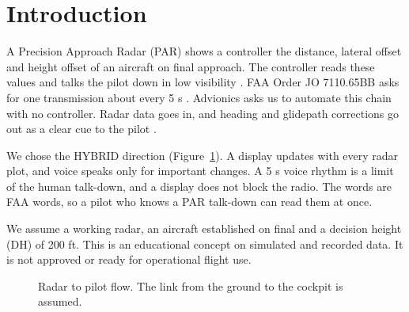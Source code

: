 \documentclass{ideathon2026}
\begin{document}
\makecover
\tableofcontents

\section{Introduction}
A Precision Approach Radar (PAR) shows a controller the distance, lateral offset and height offset of an aircraft on final
approach. The controller reads these values and talks the pilot down in low visibility \cite{skybrary,aim,afman}. FAA Order
JO 7110.65BB asks for one transmission about every 5 s \cite{jo}. Advionics asks us to automate this chain with no controller. Radar data goes
in, and heading and glidepath corrections go out as a clear cue to the pilot \cite{brief}.

We chose the HYBRID direction (Figure~\ref{fig:flow}). A display updates with every radar plot, and voice speaks only for
important changes. A 5 s voice rhythm is a limit of the human talk-down, and a display does not block the radio. The words are
FAA words, so a pilot who knows a PAR talk-down can read them at once.

We assume a working radar, an aircraft established on final and a decision height (DH) of 200 ft. This is an educational
concept on simulated and recorded data. It is not approved or ready for operational flight use.

\begin{figure}[b]
\centering
{}
\caption{Radar to pilot flow. The link from the ground to the cockpit is assumed.}
\label{fig:flow}
\end{figure}
\end{document}
